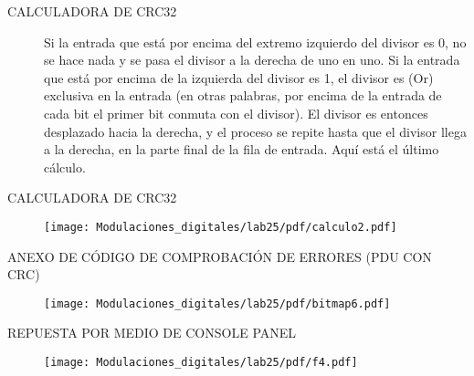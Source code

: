 \begin{frame}{CALCULADORA DE CRC32}

\begin{description}

    \item[] Si la entrada que está por encima del extremo izquierdo del divisor
es 0, no se hace nada y se pasa el divisor a la derecha de uno en uno. Si la
entrada que está por encima de la izquierda del divisor es 1, el divisor es
(Or) exclusiva en la entrada (en otras palabras, por encima de la entrada de
cada bit el primer bit conmuta con el divisor). El divisor es entonces
desplazado hacia la derecha, y el proceso se repite hasta que el divisor llega
a la derecha, en la parte final de la fila de entrada. Aquí está el último
cálculo.\\ \vspace{2mm}

\end{description}
\end{frame}
\begin{frame}{CALCULADORA DE CRC32}


\begin{figure}[H]
\centering
\vspace{-3mm}
\texttt{[image: Modulaciones\_digitales/lab25/pdf/calculo2.pdf]}
\end{figure}

\end{frame}

\begin{frame}{ANEXO DE CÓDIGO DE COMPROBACIÓN DE ERRORES (PDU CON CRC)}

\begin{figure}[H]
\centering
\vspace{-3mm}
\texttt{[image: Modulaciones\_digitales/lab25/pdf/bitmap6.pdf]}
\end{figure}

\end{frame}

\begin{frame}{REPUESTA POR MEDIO DE CONSOLE PANEL}

\begin{figure}[H]
\centering
\vspace{-3mm}
\texttt{[image: Modulaciones\_digitales/lab25/pdf/f4.pdf]}
\end{figure}

\end{frame}



